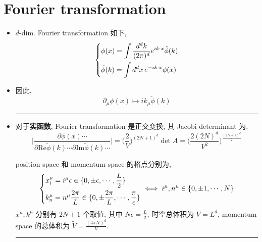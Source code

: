 \section{Fourier transformation}
\begin{itemize}
	\item $d$-dim. Fourier transformation 如下,
	\begin{equation} \label{A.2.1}
		\begin{dcases}
			\phi(x) = \int \frac{d^d k}{(2 \pi)^d} e^{i k \cdot x} \tilde{\phi}(k) \\
			\tilde{\phi}(k) = \int d^d x \, e^{- i k \cdot x} \phi(x)
		\end{dcases}
	\end{equation}
	
	\item 因此,
	\begin{equation}
		\partial_\mu \phi(x) \mapsto i k_\mu \tilde{\phi}(k)
	\end{equation}
	
	\noindent\rule[0.5ex]{\linewidth}{0.5pt} %
	
	\item 对于\textbf{实函数}, Fourier transformation 是正交变换, 其 Jacobi determinant 为,
	\begin{equation} \label{A.2.3}
		\Big| \frac{\partial \phi(x) \cdots}{\partial \mathrm{Re} \tilde{\phi}(k) \cdots \partial \mathrm{Im} \tilde{\phi}(k) \cdots} \Big| = \Big( \frac{2}{V} \Big)^{(2 N + 1)^d} \det A = \Big( \frac{2 (2 N)^d}{V^2} \Big)^{\frac{(2 N + 1)^d}{2}}
	\end{equation}
	
	\begin{tcolorbox}[title=proof:]
		position space 和 momentum space 的格点分别为,
		\begin{equation}
			\begin{dcases}
				x_i^\mu = i^\mu \epsilon \in \{0, \pm \epsilon, \cdots, \frac{L}{2}\} \\
				k_n^\mu = n^\mu \frac{2 \pi}{L} \in \{0, \pm \frac{2 \pi}{L}, \cdots, \frac{\pi}{\epsilon}\}
			\end{dcases} \iff i^\mu, n^\mu \in \{0, \pm 1, \cdots, N\}
		\end{equation}
		$x^\mu, k^\mu$ 分别有 $2 N + 1$ 个取值, 其中 $N \epsilon = \frac{L}{2}$, 时空总体积为 $V = L^d$, momentum space 的总体积为 $\tilde{V} = \frac{(4 \pi N)^d}{V}$.
		
		\noindent\rule[0.5ex]{\linewidth}{0.5pt} %
		

\end{tcolorbox}
\end{itemize}

